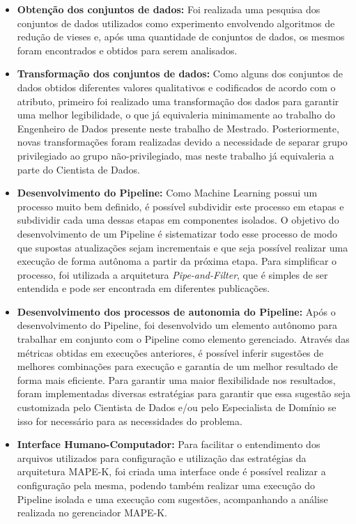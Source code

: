 \documentclass[portugues]{ic-tese}
\begin{document}
\begin{itemize}
\item \textbf{Obtenção dos conjuntos de dados:} Foi realizada uma pesquisa dos conjuntos de dados utilizados como experimento envolvendo algoritmos de redução de vieses e, após uma quantidade de conjuntos de dados, os mesmos foram encontrados e obtidos para serem analisados.

\item \textbf{Transformação dos conjuntos de dados:} Como alguns dos conjuntos de dados obtidos diferentes valores qualitativos e codificados de acordo com o atributo, primeiro foi realizado uma transformação dos dados para garantir uma melhor legibilidade, o que já equivaleria minimamente ao trabalho do Engenheiro de Dados presente neste trabalho de Mestrado. Posteriormente, novas transformações foram realizadas devido a necessidade de separar grupo privilegiado ao grupo não-privilegiado, mas neste trabalho já equivaleria a parte do Cientista de Dados.

\item \textbf{Desenvolvimento do Pipeline:} Como Machine Learning possui um processo muito bem definido, é possível subdividir este processo em etapas e subdividir cada uma dessas etapas em componentes isolados. O objetivo do desenvolvimento de um Pipeline é sistematizar todo esse processo de modo que supostas atualizações sejam incrementais e que seja possível realizar uma execução de forma autônoma a partir da próxima etapa. Para simplificar o processo, foi utilizada a arquitetura \textit{Pipe-and-Filter}, que é simples de ser entendida e pode ser encontrada em diferentes publicações.

\item \textbf{Desenvolvimento dos processos de autonomia do Pipeline:} Após o desenvolvimento do Pipeline, foi desenvolvido um elemento autônomo para trabalhar em conjunto com o Pipeline como elemento gerenciado. Através das métricas obtidas em execuções anteriores, é possível inferir sugestões de melhores combinações para execução e garantia de um melhor resultado de forma mais eficiente. Para garantir uma maior flexibilidade nos resultados, foram implementadas diversas estratégias para garantir que essa sugestão seja customizada pelo Cientista de Dados e/ou pelo Especialista de Domínio se isso for necessário para as necessidades do problema.

\item \textbf{Interface Humano-Computador:} Para facilitar o entendimento dos arquivos utilizados para configuração e utilização das estratégias da arquitetura MAPE-K, foi criada uma interface onde é possível realizar a configuração pela mesma, podendo também realizar uma execução do Pipeline isolada e uma execução com sugestões, acompanhando a análise realizada no gerenciador MAPE-K.

\end{itemize}
\end{document}
